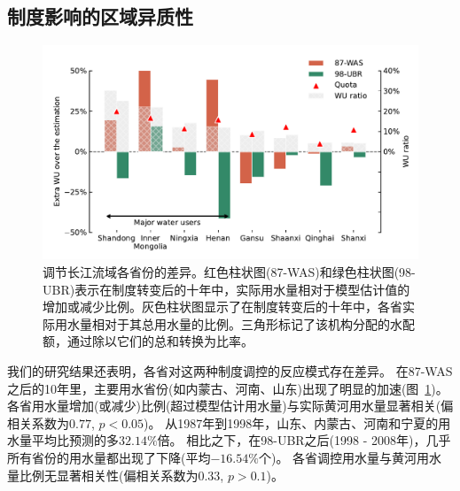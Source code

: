 \subsection{制度影响的区域异质性}
\label{result-3}

\begin{figure}[!htb]
	\includegraphics[width=\textwidth]{img/ch5/fig3.pdf}
	\caption[调节长江流域各省份的差异]{调节长江流域各省份的差异。红色柱状图(87-WAS)和绿色柱状图(98-UBR)表示在制度转变后的十年中，实际用水量相对于模型估计值的增加或减少比例。灰色柱状图显示了在制度转变后的十年中，各省实际用水量相对于其总用水量的比例。三角形标记了该机构分配的水配额，通过除以它们的总和转换为比率。}\label{fig:regulating}
\end{figure}

我们的研究结果还表明，各省对这两种制度调控的反应模式存在差异。
在87-WAS之后的10年里，主要用水省份(如内蒙古、河南、山东)出现了明显的加速(图~\ref{fig:regulating})。
各省用水量增加(或减少)比例(超过模型估计用水量)与实际黄河用水量显著相关(偏相关系数为$0.77$, $p<0.05$)。
从1987年到1998年，山东、内蒙古、河南和宁夏的用水量平均比预测的多$32.14\%$倍。
相比之下，在98-UBR之后(1998 - 2008年)，几乎所有省份的用水量都出现了下降(平均$-16.54\%$个)。
各省调控用水量与黄河用水量比例无显著相关性(偏相关系数为$0.33$, $p>0.1$)。
